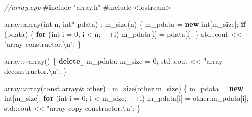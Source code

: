 \documentclass[
]{article}
\newenvironment{Shaded}{}{}
\newcommand{\AttributeTok}[1]{\textcolor[rgb]{0.49,0.56,0.16}{#1}}
\newcommand{\BuiltInTok}[1]{#1}
\newcommand{\CommentTok}[1]{\textcolor[rgb]{0.38,0.63,0.69}{\textit{#1}}}
\newcommand{\ControlFlowTok}[1]{\textcolor[rgb]{0.00,0.44,0.13}{\textbf{#1}}}
\newcommand{\DataTypeTok}[1]{\textcolor[rgb]{0.56,0.13,0.00}{#1}}
\newcommand{\DecValTok}[1]{\textcolor[rgb]{0.25,0.63,0.44}{#1}}
\newcommand{\ImportTok}[1]{#1}
\newcommand{\KeywordTok}[1]{\textcolor[rgb]{0.00,0.44,0.13}{\textbf{#1}}}
\newcommand{\NormalTok}[1]{#1}
\newcommand{\OperatorTok}[1]{\textcolor[rgb]{0.40,0.40,0.40}{#1}}
\newcommand{\PreprocessorTok}[1]{\textcolor[rgb]{0.74,0.48,0.00}{#1}}
\newcommand{\SpecialCharTok}[1]{\textcolor[rgb]{0.25,0.44,0.63}{#1}}
\newcommand{\StringTok}[1]{\textcolor[rgb]{0.25,0.44,0.63}{#1}}
\newcommand{\VariableTok}[1]{\textcolor[rgb]{0.10,0.09,0.49}{#1}}
\begin{document}
\begin{Shaded}
\begin{Highlighting}[]
\CommentTok{//array.cpp}
\PreprocessorTok{\#include }\ImportTok{"array.h"}
\PreprocessorTok{\#include }\ImportTok{\textless{}iostream\textgreater{}}

\NormalTok{array}\OperatorTok{::}\NormalTok{array}\OperatorTok{(}\DataTypeTok{int}\NormalTok{ n}\OperatorTok{,} \DataTypeTok{int}\OperatorTok{*}\NormalTok{ pdata}\OperatorTok{)} \OperatorTok{:} \VariableTok{m\_size}\OperatorTok{(}\NormalTok{n}\OperatorTok{)} \OperatorTok{\{}
    \VariableTok{m\_pdata} \OperatorTok{=} \KeywordTok{new} \DataTypeTok{int}\OperatorTok{[}\VariableTok{m\_size}\OperatorTok{];}
    \ControlFlowTok{if} \OperatorTok{(}\NormalTok{pdata}\OperatorTok{)} \OperatorTok{\{}
        \ControlFlowTok{for} \OperatorTok{(}\DataTypeTok{int}\NormalTok{ i }\OperatorTok{=} \DecValTok{0}\OperatorTok{;}\NormalTok{ i }\OperatorTok{\textless{}}\NormalTok{ n}\OperatorTok{;} \OperatorTok{++}\NormalTok{i}\OperatorTok{)}
            \VariableTok{m\_pdata}\OperatorTok{[}\NormalTok{i}\OperatorTok{]} \OperatorTok{=}\NormalTok{ pdata}\OperatorTok{[}\NormalTok{i}\OperatorTok{];}
    \OperatorTok{\}}
    \BuiltInTok{std::}\NormalTok{cout}\OperatorTok{ \textless{}\textless{}} \StringTok{"array constructor.}\SpecialCharTok{\textbackslash{}n}\StringTok{"}\OperatorTok{;}
\OperatorTok{\}}

\NormalTok{array}\OperatorTok{::\textasciitilde{}}\NormalTok{array}\OperatorTok{()} \OperatorTok{\{}
    \KeywordTok{delete}\OperatorTok{[]} \VariableTok{m\_pdata}\OperatorTok{;}
    \VariableTok{m\_size} \OperatorTok{=} \DecValTok{0}\OperatorTok{;}
    \BuiltInTok{std::}\NormalTok{cout}\OperatorTok{ \textless{}\textless{}} \StringTok{"array deconstructor.}\SpecialCharTok{\textbackslash{}n}\StringTok{"}\OperatorTok{;}
\OperatorTok{\}}

\NormalTok{array}\OperatorTok{::}\NormalTok{array}\OperatorTok{(}\AttributeTok{const}\NormalTok{ array}\OperatorTok{\&}\NormalTok{ other}\OperatorTok{)} \OperatorTok{:} \VariableTok{m\_size}\OperatorTok{(}\NormalTok{other}\OperatorTok{.}\VariableTok{m\_size}\OperatorTok{)} \OperatorTok{\{}
    \VariableTok{m\_pdata} \OperatorTok{=} \KeywordTok{new} \DataTypeTok{int}\OperatorTok{[}\VariableTok{m\_size}\OperatorTok{];}
    \ControlFlowTok{for} \OperatorTok{(}\DataTypeTok{int}\NormalTok{ i }\OperatorTok{=} \DecValTok{0}\OperatorTok{;}\NormalTok{ i }\OperatorTok{\textless{}} \VariableTok{m\_size}\OperatorTok{;} \OperatorTok{++}\NormalTok{i}\OperatorTok{)}
        \VariableTok{m\_pdata}\OperatorTok{[}\NormalTok{i}\OperatorTok{]} \OperatorTok{=}\NormalTok{ other}\OperatorTok{.}\VariableTok{m\_pdata}\OperatorTok{[}\NormalTok{i}\OperatorTok{];}
    \BuiltInTok{std::}\NormalTok{cout}\OperatorTok{ \textless{}\textless{}} \StringTok{"array copy constructor.}\SpecialCharTok{\textbackslash{}n}\StringTok{"}\OperatorTok{;}
\OperatorTok{\}}


\end{Highlighting}
\end{Shaded}
\end{document}
